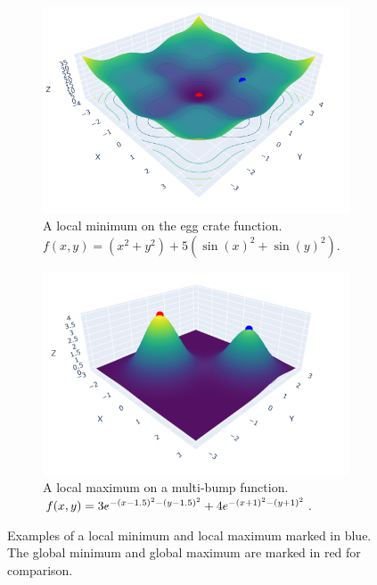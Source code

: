 \begin{figure}[h]
    \begin{subfigure}[b]{0.48\linewidth}
        \centering
        \includegraphics[width=\linewidth]{figures/2background/local_min.png}
        \caption{A local minimum on the egg crate function. \\
        $f(x,y) = (x^2 + y^2) + 5 (\sin(x)^2 + \sin(y)^2)$.
        }
        \label{fig:local_min}
    \end{subfigure}
    \hfill
    \begin{subfigure}[b]{0.48\linewidth}
        \centering
        \includegraphics[width=\linewidth]{figures/2background/local_max.png}
        \caption{A local maximum on a multi-bump function. \\
        $f(x,y) = 3 e^{-(x-1.5)^2 - (y-1.5)^2} + \\
         4 e^{-(x+1)^2 - (y+1)^2} $.}
        \label{fig:local_max}
    \end{subfigure}
    \caption{Examples of a local minimum and local maximum marked in blue. The global minimum and global maximum are marked in red for comparison.}
    \label{fig:local_min_max}
\end{figure}

